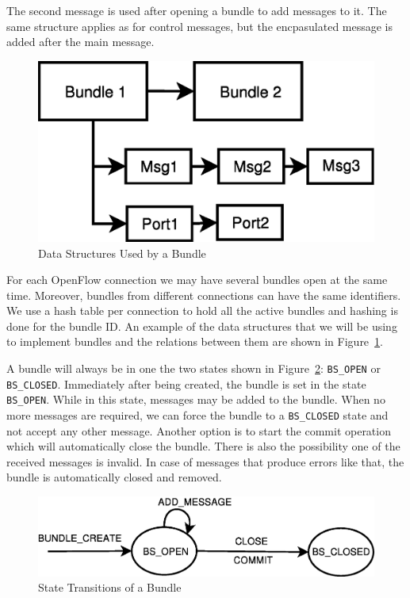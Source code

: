 The second message is used after opening a bundle to add messages to it. The same structure applies as for control
messages, but the encpasulated message is added after the main message.

\begin{figure}[h]
\begin{center}
\includegraphics[scale=0.5]{src/img/bundle-content.eps}
\end{center}
\caption{Data Structures Used by a Bundle}
\label{fig:bundles}
\end{figure}

For each OpenFlow connection we may have several bundles open at the same time. Moreover, bundles from different connections
can have the same identifiers. We use a hash table per connection to hold all the active bundles and hashing is done for 
the bundle ID. An example of the data structures that we will be using to implement bundles and the relations between
them are shown in Figure~\ref{fig:bundles}.

A bundle will always be in one the two states shown in Figure~\ref{fig:bundle-state}: \texttt{BS_OPEN} or \texttt{BS_CLOSED}.
Immediately after being created, the bundle is set in the state \texttt{BS_OPEN}. While in this state, messages may be
added to the bundle. When no more messages are required, we can force the bundle to a \texttt{BS_CLOSED} state and not
accept any other message. Another option is to start the commit operation which will automatically close the bundle.
There is also the possibility one of the received messages is invalid. In case of messages that produce errors like that,
the bundle is automatically closed and removed.

\begin{figure}[h]
\begin{center}
\includegraphics[scale=0.5]{src/img/bundle-state-machine.eps}
\end{center}
\caption{State Transitions of a Bundle}
\label{fig:bundle-state}
\end{figure}

